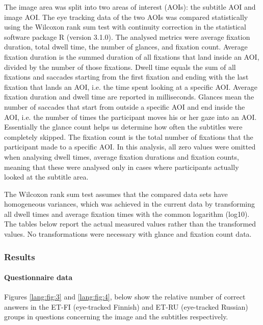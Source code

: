\documentclass[output=paper]{langsci/langscibook}
\begin{document}
The image area was split into two areas of interest (AOIs): the subtitle AOI and image AOI. The eye tracking data of the two AOIs was compared statistically using the Wilcoxon rank sum test with continuity correction in the statistical software package R (version 3.1.0). The analysed metrics were average fixation duration, total dwell time, the number of glances, and fixation count. Average fixation duration is the summed duration of all fixations that land inside an AOI, divided by the number of those fixations. Dwell time equals the sum of all fixations and saccades starting from the first fixation and ending with the last fixation that lands an AOI, i.e. the time spent looking at a specific AOI. Average fixation duration and dwell time are reported in milliseconds. Glances mean the number of saccades that start from outside a specific AOI and end inside the AOI, i.e. the number of times the participant moves his or her gaze into an AOI. Essentially the glance count helps us determine how often the subtitles were completely skipped. The fixation count is the total number of fixations that the participant made to a specific AOI. In this analysis, all zero values were omitted when analysing dwell times, average fixation durations and fixation counts, meaning that these were analysed only in cases where participants actually looked at the subtitle area.

The Wilcoxon rank sum test assumes that the compared data sets have homogeneous variances, which was achieved in the current data by transforming all dwell times and average fixation times with the common logarithm (log10). The tables below report the actual measured values rather than the transformed values. No transformations were necessary with glance and fixation count data.

\subsubsection{Results}

\paragraph{Questionnaire data}


Figures \ref{lang:fig:3} and \ref{lang:fig:4}, below show the relative number of correct answers in the ET-FI (eye-tracked Finnish) and ET-RU (eye-tracked Russian) groups in questions concerning the image and the subtitles respectively.
\end{document}
